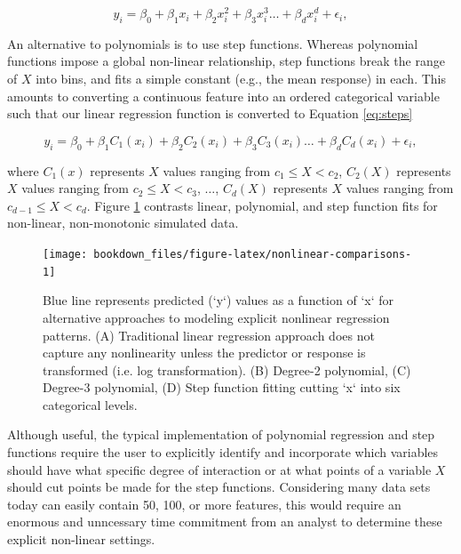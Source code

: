 \documentclass[]{krantz}
\begin{document}
\begin{equation}
\label{eq:poly}
  y_i = \beta_0 + \beta_1 x_i + \beta_2 x^2_i + \beta_3 x^3_i \dots + \beta_d x^d_i + \epsilon_i,
\end{equation}

An alternative to polynomials is to use step functions. Whereas polynomial functions impose a global non-linear relationship, step functions break the range of \(X\) into bins, and fits a simple constant (e.g., the mean response) in each. This amounts to converting a continuous feature into an ordered categorical variable such that our linear regression function is converted to Equation \eqref{eq:steps}

\begin{equation}
\label{eq:steps}
  y_i = \beta_0 + \beta_1 C_1(x_i) + \beta_2 C_2(x_i) + \beta_3 C_3(x_i) \dots + \beta_d C_d(x_i) + \epsilon_i,
\end{equation}

where \(C_1(x)\) represents \(X\) values ranging from \(c_1 \leq X < c_2\), \(C_2\left(X\right)\) represents \(X\) values ranging from \(c_2 \leq X < c_3\), \(\dots\), \(C_d\left(X\right)\) represents \(X\) values ranging from \(c_{d-1} \leq X < c_d\). Figure \ref{fig:nonlinear-comparisons} contrasts linear, polynomial, and step function fits for non-linear, non-monotonic simulated data.

\begin{figure}

{\centering \texttt{[image: bookdown\_files/figure-latex/nonlinear-comparisons-1]} 

}

\caption{Blue line represents predicted (`y`) values as a function of `x` for alternative approaches to modeling explicit nonlinear regression patterns. (A) Traditional linear regression approach does not capture any nonlinearity unless the predictor or response is transformed (i.e. log transformation). (B) Degree-2 polynomial, (C) Degree-3 polynomial, (D) Step function fitting cutting `x` into six categorical levels.}\label{fig:nonlinear-comparisons}
\end{figure}

Although useful, the typical implementation of polynomial regression and step functions require the user to explicitly identify and incorporate which variables should have what specific degree of interaction or at what points of a variable \(X\) should cut points be made for the step functions. Considering many data sets today can easily contain 50, 100, or more features, this would require an enormous and unncessary time commitment from an analyst to determine these explicit non-linear settings.
\end{document}
